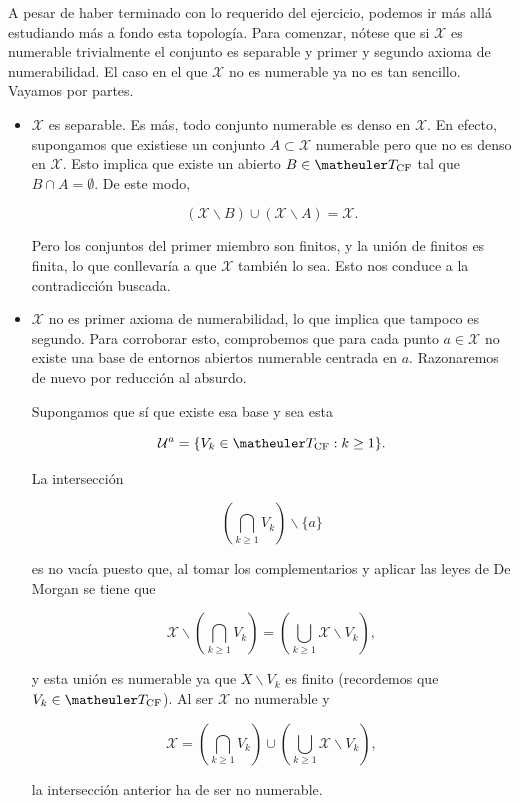 A pesar de haber terminado con lo requerido del ejercicio, podemos ir más allá estudiando más a fondo esta topología. Para comenzar, nótese que si $\mathcal{X}$ es numerable trivialmente el conjunto es separable y primer y segundo axioma de numerabilidad. El caso en el que $\mathcal{X}$ no es numerable ya no es tan sencillo. Vayamos por partes.

\begin{itemize}
\item $\mathcal{X}$ es separable. Es más, todo conjunto numerable es denso en $\mathcal{X}$. En efecto, supongamos que existiese un conjunto $A \subset \mathcal{X}$ numerable pero que no es denso en $\mathcal{X}$. Esto implica que existe un abierto $B\in \T_{\text{CF}}$ tal que $B\cap A = \emptyset$. De este modo, 

\[(\mathcal{X}\backslash B)\cup (\mathcal{X}\backslash A)=\mathcal{X}.\]

Pero los conjuntos del primer miembro son finitos, y la unión de finitos es finita, lo que conllevaría a que $\mathcal{X}$ también lo sea. Esto nos conduce a la  contradicción buscada. 

\item $\mathcal{X}$ no es primer axioma de numerabilidad, lo que implica que tampoco es segundo. Para corroborar esto, comprobemos que para cada punto $a\in \mathcal{X}$ no existe una base de entornos abiertos numerable centrada en $a$. Razonaremos de nuevo por reducción al absurdo.

Supongamos que sí que existe esa base y sea esta 

\[\mathcal{U}^a=\{V_k \in\T_{\text{CF}}: k \geq 1\}.\]

La intersección 

\[\left(\bigcap_{k\geq 1} V_k\right)\backslash \{a\}\]

es no vacía puesto que, al tomar los complementarios y aplicar las leyes de De Morgan se tiene que 

\[\mathcal{X} \backslash \left(\bigcap_{k\geq 1} V_k\right)= \left(\bigcup_{k\geq 1} \mathcal{X} \backslash V_k\right), \]

y esta unión es numerable ya que $X \backslash V_k$ es finito (recordemos que $V_k \in \T_{\text{CF}}$). Al ser $\mathcal{X}$ no numerable y 

\[\mathcal{X}= \left(\bigcap_{k\geq 1} V_k\right) \cup \left(\bigcup_{k\geq 1} \mathcal{X}\backslash V_k\right),\]

la intersección anterior ha de ser no numerable.


\end{itemize}
